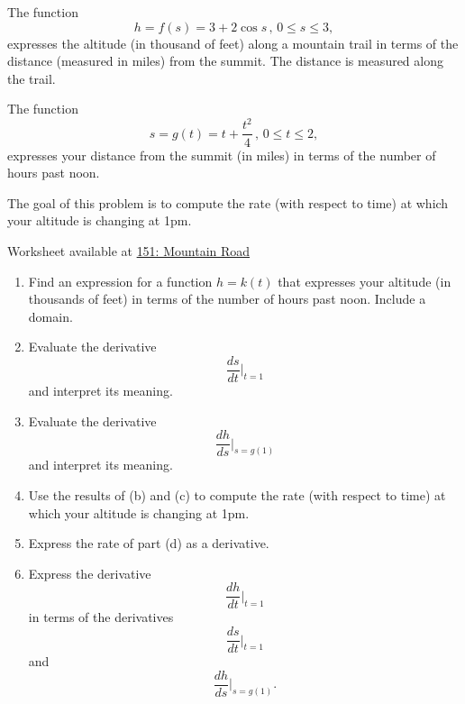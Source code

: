 \documentclass{ximera}
\begin{document}
\begin{exercise}  \label{Exe:5tyjjjhbbnn}
The function
\[
    h = f(s)  = 3+2\cos s \, ,\, 0\leq s \leq 3 ,
\]
expresses the altitude (in thousand of feet) along a mountain trail in terms of the distance (measured in miles) from the summit. The distance is measured along the trail.

The function 
\[
     s = g(t) = t + \frac{t^2}{4}  \, , \, 0 \leq t \leq 2 ,
\]
expresses your distance from the summit (in miles) in terms of the number of hours past noon.

The goal of this problem is to compute the rate (with respect to time) at which your altitude is changing at 1pm.

\begin{onlineOnly}
    \begin{center}
\end{center}
\end{onlineOnly}

Worksheet available at \href{https://www.desmos.com/calculator/twfsqmmgyb}{151: Mountain Road}



\begin{enumerate}
\item Find an expression for a function $h=k(t)$ that expresses your altitude (in thousands of feet) in terms of the number of hours past noon. Include a domain.

\item Evaluate the derivative
\[
      \frac{ds}{dt}\Big|_{t=1}
\]
and interpret its meaning.

\item Evaluate the derivative
\[
      \frac{dh}{ds}\Big|_{s=g(1)}
\]
and interpret its meaning.

\item Use the results of (b) and (c) to compute the rate (with respect to time) at which your altitude is changing at 1pm.

\item Express the rate of part (d) as a derivative.

\item Express the derivative
\[
    \frac{dh}{dt}\Big|_{t=1}
\]
in terms of the derivatives 
\[
      \frac{ds}{dt}\Big|_{t=1}
\]
and 
\[
      \frac{dh}{ds}\Big|_{s=g(1)} .
\]
\end{enumerate}


\end{exercise}
\end{document}
